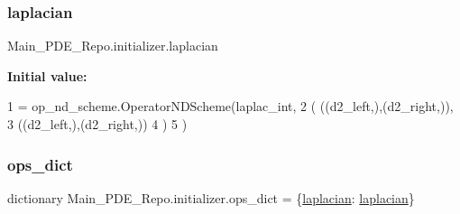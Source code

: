 \mbox{\label{namespaceMain__PDE__Repo_1_1initializer_a5d29fae6a76c81157540503a6d4340a0}} 
\subsubsection{\texorpdfstring{laplacian}{laplacian}}
{\footnotesize\ttfamily Main\+\_\+\+P\+D\+E\+\_\+\+Repo.\+initializer.\+laplacian}

{\bfseries Initial value\+:}
\begin{DoxyCode}
1 =  op\_nd\_scheme.OperatorNDScheme(laplac\_int,
2                                            ( ((d2\_left,),(d2\_right,)),
3                                              ((d2\_left,),(d2\_right,))
4                                            )
5                                          )
\end{DoxyCode}
\mbox{\label{namespaceMain__PDE__Repo_1_1initializer_aa5c3b3b00275767f3e2e1c8eca05c3e3}} 
\subsubsection{\texorpdfstring{ops\+\_\+dict}{ops\_dict}}
{\footnotesize\ttfamily dictionary Main\+\_\+\+P\+D\+E\+\_\+\+Repo.\+initializer.\+ops\+\_\+dict = \{\textquotesingle{}\hyperlink{namespaceMain__PDE__Repo_1_1initializer_a5d29fae6a76c81157540503a6d4340a0}{laplacian}\textquotesingle{}\+: \hyperlink{namespaceMain__PDE__Repo_1_1initializer_a5d29fae6a76c81157540503a6d4340a0}{laplacian}\}}

